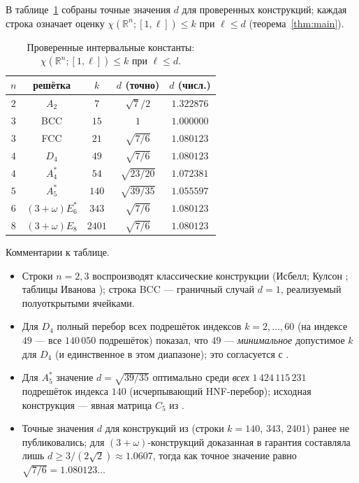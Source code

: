 \documentclass[12pt]{article}
\theoremstyle{plain}
\theoremstyle{definition}
\theoremstyle{remark}
\newcommand{\RR}{\mathbb{R}}
\begin{document}
В таблице~\ref{tab:constants} собраны точные значения $d$ для проверенных
конструкций; каждая строка означает оценку $\chi(\RR^n;[1,\ell])\le k$ при
$\ell\le d$ (теорема~\ref{thm:main}).

\begin{table}[h!]
\centering
\caption{Проверенные интервальные константы:
$\chi(\RR^n;[1,\ell])\le k$ при $\ell\le d$.}
\label{tab:constants}
\medskip
\begin{tabular}{ccccc}
\hline
$n$ & решётка & $k$ & $d$ (точно) & $d$ (числ.)\\
\hline
$2$ & $A_2$            & $7$    & $\sqrt{7}/2$   & $1.322876$\\
$3$ & BCC              & $15$   & $1$            & $1.000000$\\
$3$ & FCC              & $21$   & $\sqrt{7/6}$   & $1.080123$\\
$4$ & $D_4$            & $49$   & $\sqrt{7/6}$   & $1.080123$\\
$4$ & $A_4^{*}$        & $54$   & $\sqrt{23/20}$ & $1.072381$\\
$5$ & $A_5^{*}$        & $140$  & $\sqrt{39/35}$ & $1.055597$\\
$6$ & $(3+\omega)E_6^{*}$ & $343$  & $\sqrt{7/6}$   & $1.080123$\\
$8$ & $(3+\omega)E_8$     & $2401$ & $\sqrt{7/6}$   & $1.080123$\\
\hline
\end{tabular}
\end{table}

Комментарии к таблице.

\begin{itemize}
\item Строки $n=2,3$ воспроизводят классические конструкции (Исбелл; Кулсон
      \cite{Coulson2002}; таблицы Иванова \cite{Ivanov2011}); строка BCC ---
      граничный случай $d=1$, реализуемый полуоткрытыми ячейками.
\item Для $D_4$ полный перебор всех подрешёток индексов $k=2,\dots,60$ (на
      индексе $49$ --- все $140\,050$ подрешёток) показал, что $49$ ---
      \emph{минимальное} допустимое $k$ для $D_4$ (и единственное в этом
      диапазоне); это согласуется с \cite[Prop.~12]{Arman2021}.
\item Для $A_5^{*}$ значение $d=\sqrt{39/35}$ оптимально среди \emph{всех}
      $1\,424\,115\,231$ подрешёток индекса $140$ (исчерпывающий
      HNF-перебор); исходная конструкция --- явная матрица $C_5$ из
      \cite{Arman2021}.
\item Точные значения $d$ для конструкций из \cite{Arman2021}
      (строки $k=140$, $343$, $2401$) ранее не публиковались; для
      $(3+\omega)$-конструкций доказанная в \cite{Arman2021} гарантия
      составляла лишь $d\ge 3/(2\sqrt{2})\approx 1.0607$, тогда как точное
      значение равно $\sqrt{7/6}=1.080123\ldots$
\end{itemize}
\end{document}
